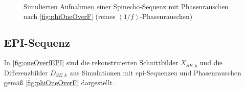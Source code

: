\begin{figure}[H]
	\hfill
	\hfill
	\caption[($1/f$)-Rauschen (Spinecho-Sequenz)]{Simulierten Aufnahmen einer Spinecho-Sequenz mit Phasenrauschen nach \autoref{fig:phiOneOverF}  (reines $(1/f)$-Phasenrauschen)}
	\label{fig:oneOverfSE}	
\end{figure}

\clearpage
\subsection{EPI-Sequenz}
In \autoref{fig:oneOverfEPI} sind die rekonstruierten Schnittbilder $X_{SE,k}$ und die Differenzbilder $D_{SE,k}$ aus Simulationen mit \gls{epi}-Sequenzen und Phasenrauschen gemäß \autoref{fig:phiOneOverF} dargestellt.

